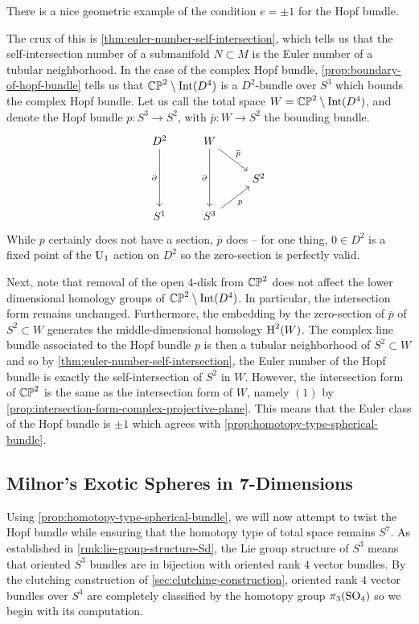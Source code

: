 \begin{remark}
	There is a nice geometric example of the condition $e=\pm 1$ for the Hopf bundle.

	The crux of this is \cref{thm:euler-number-self-intersection}, which tells us that the self-intersection number of a submanifold $N\subset M$ is the Euler number of a tubular neighborhood.
	In the case of the complex Hopf bundle, \cref{prop:boundary-of-hopf-bundle} tells us that $\mathbb{CP}^2\setminus \operatorname{Int}(D^4)$ is a $D^2$-bundle over $S^3$ which bounds the complex Hopf bundle. Let us call the total space $W=\mathbb{CP}^2\setminus \operatorname{Int}(D^4)$, and denote the Hopf bundle $p : S^3 \to S^2$, with $\overline{p} : W \to S^2$ the bounding bundle.
	\[
		\begin{tikzcd}
			D^2 & W & \\
			& & S^2\\
			S^1 & S^3 &
			\arrow["\partial"', from=1-1, to=3-1]
			\arrow["\partial"', from=1-2, to=3-2]
			\arrow["p"', from=3-2, to=2-3]
			\arrow["\overline{p}", from=1-2, to=2-3]
		\end{tikzcd}
	\]
	While $p$ certainly does not have a section, $\overline{p}$ does -- for one thing, $0\in D^2$ is a fixed point of the $\mathrm{U}_1$ action on $D^2$ so the zero-section is perfectly valid.

	Next, note that removal of the open $4$-disk from $\mathbb{CP}^2$ does not affect the lower dimensional homology groups of $\mathbb{CP}^2\setminus \operatorname{Int}(D^4)$. In particular, the intersection form remains unchanged.
	Furthermore, the embedding by the zero-section of $\overline{p}$ of $S^2\subset W$ generates the middle-dimensional homology $\operatorname{H}^2(W)$. The complex line bundle associated to the Hopf bundle $p$ is then a tubular neighborhood of $S^2\subset W$ and so by \cref{thm:euler-number-self-intersection}, the Euler number of the Hopf bundle is exactly the self-intersection of $S^2$ in $W$. However, the intersection form of $\mathbb{CP}^2$ is the same as the intersection form of $W$, namely $(1)$ by \cref{prop:intersection-form-complex-projective-plane}. This means that the Euler class of the Hopf bundle is $\pm 1$ which agrees with \cref{prop:homotopy-type-spherical-bundle}.
\end{remark}

\subsection{Milnor's Exotic Spheres in 7-Dimensions}

Using \cref{prop:homotopy-type-spherical-bundle}, we will now attempt to twist the Hopf bundle while ensuring that the homotopy type of total space remains $S^7$. As established in \cref{rmk:lie-group-structure-Sd}, the Lie group structure of $S^3$ means that oriented $S^3$ bundles are in bijection with oriented rank $4$ vector bundles. By the clutching construction of \cref{sec:clutching-construction}, oriented rank $4$ vector bundles over $S^4$ are completely classified by the homotopy group $\pi_3(\mathrm{SO}_4)$ so we begin with its computation.

